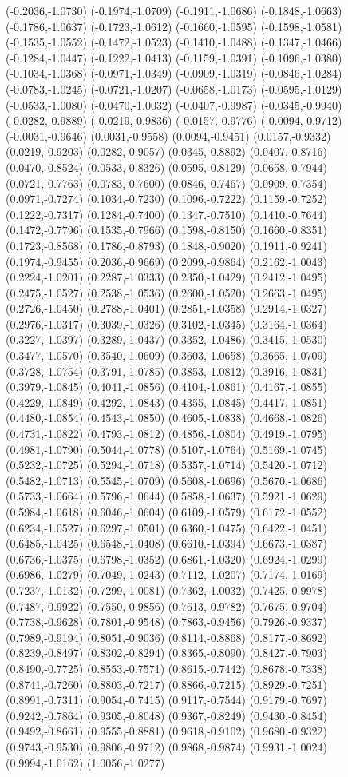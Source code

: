 (-0.2036,-1.0730) (-0.1974,-1.0709) (-0.1911,-1.0686) (-0.1848,-1.0663) (-0.1786,-1.0637) (-0.1723,-1.0612) (-0.1660,-1.0595) (-0.1598,-1.0581) (-0.1535,-1.0552) (-0.1472,-1.0523) (-0.1410,-1.0488) (-0.1347,-1.0466) (-0.1284,-1.0447) (-0.1222,-1.0413) (-0.1159,-1.0391) (-0.1096,-1.0380) (-0.1034,-1.0368) (-0.0971,-1.0349) (-0.0909,-1.0319) (-0.0846,-1.0284) (-0.0783,-1.0245) (-0.0721,-1.0207) (-0.0658,-1.0173) (-0.0595,-1.0129) (-0.0533,-1.0080) (-0.0470,-1.0032) (-0.0407,-0.9987) (-0.0345,-0.9940) (-0.0282,-0.9889) (-0.0219,-0.9836) (-0.0157,-0.9776) (-0.0094,-0.9712) (-0.0031,-0.9646) (0.0031,-0.9558) (0.0094,-0.9451) (0.0157,-0.9332) (0.0219,-0.9203) (0.0282,-0.9057) (0.0345,-0.8892) (0.0407,-0.8716) (0.0470,-0.8524) (0.0533,-0.8326) (0.0595,-0.8129) (0.0658,-0.7944) (0.0721,-0.7763) (0.0783,-0.7600) (0.0846,-0.7467) (0.0909,-0.7354) (0.0971,-0.7274) (0.1034,-0.7230) (0.1096,-0.7222) (0.1159,-0.7252) (0.1222,-0.7317) (0.1284,-0.7400) (0.1347,-0.7510) (0.1410,-0.7644) (0.1472,-0.7796) (0.1535,-0.7966) (0.1598,-0.8150) (0.1660,-0.8351) (0.1723,-0.8568) (0.1786,-0.8793) (0.1848,-0.9020) (0.1911,-0.9241) (0.1974,-0.9455) (0.2036,-0.9669) (0.2099,-0.9864) (0.2162,-1.0043) (0.2224,-1.0201) (0.2287,-1.0333) (0.2350,-1.0429) (0.2412,-1.0495) (0.2475,-1.0527) (0.2538,-1.0536) (0.2600,-1.0520) (0.2663,-1.0495) (0.2726,-1.0450) (0.2788,-1.0401) (0.2851,-1.0358) (0.2914,-1.0327) (0.2976,-1.0317) (0.3039,-1.0326) (0.3102,-1.0345) (0.3164,-1.0364) (0.3227,-1.0397) (0.3289,-1.0437) (0.3352,-1.0486) (0.3415,-1.0530) (0.3477,-1.0570) (0.3540,-1.0609) (0.3603,-1.0658) (0.3665,-1.0709) (0.3728,-1.0754) (0.3791,-1.0785) (0.3853,-1.0812) (0.3916,-1.0831) (0.3979,-1.0845) (0.4041,-1.0856) (0.4104,-1.0861) (0.4167,-1.0855) (0.4229,-1.0849) (0.4292,-1.0843) (0.4355,-1.0845) (0.4417,-1.0851) (0.4480,-1.0854) (0.4543,-1.0850) (0.4605,-1.0838) (0.4668,-1.0826) (0.4731,-1.0822) (0.4793,-1.0812) (0.4856,-1.0804) (0.4919,-1.0795) (0.4981,-1.0790) (0.5044,-1.0778) (0.5107,-1.0764) (0.5169,-1.0745) (0.5232,-1.0725) (0.5294,-1.0718) (0.5357,-1.0714) (0.5420,-1.0712) (0.5482,-1.0713) (0.5545,-1.0709) (0.5608,-1.0696) (0.5670,-1.0686) (0.5733,-1.0664) (0.5796,-1.0644) (0.5858,-1.0637) (0.5921,-1.0629) (0.5984,-1.0618) (0.6046,-1.0604) (0.6109,-1.0579) (0.6172,-1.0552) (0.6234,-1.0527) (0.6297,-1.0501) (0.6360,-1.0475) (0.6422,-1.0451) (0.6485,-1.0425) (0.6548,-1.0408) (0.6610,-1.0394) (0.6673,-1.0387) (0.6736,-1.0375) (0.6798,-1.0352) (0.6861,-1.0320) (0.6924,-1.0299) (0.6986,-1.0279) (0.7049,-1.0243) (0.7112,-1.0207) (0.7174,-1.0169) (0.7237,-1.0132) (0.7299,-1.0081) (0.7362,-1.0032) (0.7425,-0.9978) (0.7487,-0.9922) (0.7550,-0.9856) (0.7613,-0.9782) (0.7675,-0.9704) (0.7738,-0.9628) (0.7801,-0.9548) (0.7863,-0.9456) (0.7926,-0.9337) (0.7989,-0.9194) (0.8051,-0.9036) (0.8114,-0.8868) (0.8177,-0.8692) (0.8239,-0.8497) (0.8302,-0.8294) (0.8365,-0.8090) (0.8427,-0.7903) (0.8490,-0.7725) (0.8553,-0.7571) (0.8615,-0.7442) (0.8678,-0.7338) (0.8741,-0.7260) (0.8803,-0.7217) (0.8866,-0.7215) (0.8929,-0.7251) (0.8991,-0.7311) (0.9054,-0.7415) (0.9117,-0.7544) (0.9179,-0.7697) (0.9242,-0.7864) (0.9305,-0.8048) (0.9367,-0.8249) (0.9430,-0.8454) (0.9492,-0.8661) (0.9555,-0.8881) (0.9618,-0.9102) (0.9680,-0.9322) (0.9743,-0.9530) (0.9806,-0.9712) (0.9868,-0.9874) (0.9931,-1.0024) (0.9994,-1.0162) (1.0056,-1.0277) 